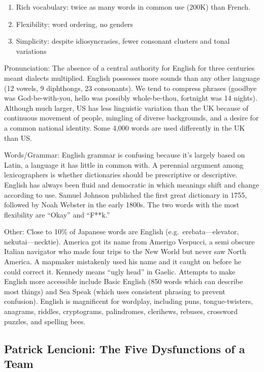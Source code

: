 \documentclass[
]{article}
\begin{document}
\begin{enumerate}
\def\labelenumi{\arabic{enumi}.}
\item
  Rich vocabulary: twice as many words in common use (200K) than French.
\item
  Flexibility: word ordering, no genders
\item
  Simplicity: despite idiosyncrasies, fewer consonant clusters and tonal
  variations
\end{enumerate}

Pronunciation: The absence of a central authority for English for three
centuries meant dialects multiplied. English possesses more sounds than
any other language (12 vowels, 9 diphthongs, 23 consonants). We tend to
compress phrases (goodbye was God-be-with-you, hello was possibly
whole-be-thou, fortnight was 14 nights). Although much larger, US has
less linguistic variation than the UK because of continuous movement of
people, mingling of diverse backgrounds, and a desire for a common
national identity. Some 4,000 words are used differently in the UK than
US.

Words/Grammar: English grammar is confusing because it's largely based
on Latin, a language it has little in common with. A perennial argument
among lexicographers is whether dictionaries should be prescriptive or
descriptive. English has always been fluid and democratic in which
meanings shift and change according to use. Samuel Johnson published the
first great dictionary in 1755, followed by Noah Webster in the early
1800s. The two words with the most flexibility are ``Okay'' and
``F**k.''

Other: Close to 10\% of Japanese words are English
(e.g.~erebata---elevator, nekutai---necktie). America got its name from
Amerigo Vespucci, a semi obscure Italian navigator who made four trips
to the New World but never saw North America. A mapmaker mistakenly used
his name and it caught on before he could correct it. Kennedy means
``ugly head'' in Gaelic. Attempts to make English more accessible
include Basic English (850 words which can describe most things) and Sea
Speak (which uses consistent phrasing to prevent confusion). English is
magnificent for wordplay, including puns, tongue-twisters, anagrams,
riddles, cryptograms, palindromes, clerihews, rebuses, crossword
puzzles, and spelling bees.

\hypertarget{patrick-lencioni-the-five-dysfunctions-of-a-team}{%
\subsection{Patrick Lencioni: The Five Dysfunctions of a
Team}\label{patrick-lencioni-the-five-dysfunctions-of-a-team}}
\end{document}
